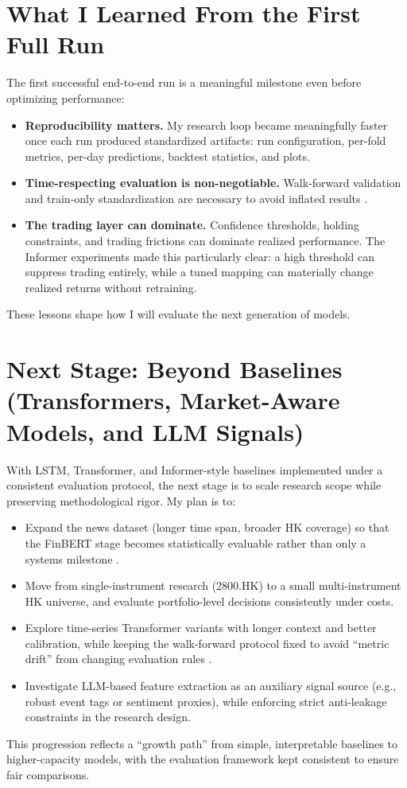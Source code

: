 \documentclass[letterpaper]{article} %
\begin{document}
\section{What I Learned From the First Full Run}
The first successful end-to-end run is a meaningful milestone even before optimizing performance:
\begin{itemize}
  \item \textbf{Reproducibility matters.} My research loop became meaningfully faster once each run produced standardized artifacts: run configuration, per-fold metrics, per-day predictions, backtest statistics, and plots.
  \item \textbf{Time-respecting evaluation is non-negotiable.} Walk-forward validation and train-only standardization are necessary to avoid inflated results \citep{bergmeir2018}.
  \item \textbf{The trading layer can dominate.} Confidence thresholds, holding constraints, and trading frictions can dominate realized performance. The Informer experiments made this particularly clear: a high threshold can suppress trading entirely, while a tuned mapping can materially change realized returns without retraining.
\end{itemize}
These lessons shape how I will evaluate the next generation of models.

\section{Next Stage: Beyond Baselines (Transformers, Market-Aware Models, and LLM Signals)}
With LSTM, Transformer, and Informer-style baselines implemented under a consistent evaluation protocol, the next stage is to scale research scope while preserving methodological rigor. My plan is to:
\begin{itemize}
  \item Expand the news dataset (longer time span, broader HK coverage) so that the FinBERT stage becomes statistically evaluable rather than only a systems milestone \citep{leetaru2013gdelt,araci2019finbert}.
  \item Move from single-instrument research (2800.HK) to a small multi-instrument HK universe, and evaluate portfolio-level decisions consistently under costs.
  \item Explore time-series Transformer variants with longer context and better calibration, while keeping the walk-forward protocol fixed to avoid ``metric drift'' from changing evaluation rules \citep{bailey2014,lopezdeprado2018}.
  \item Investigate LLM-based feature extraction as an auxiliary signal source (e.g., robust event tags or sentiment proxies), while enforcing strict anti-leakage constraints in the research design.
\end{itemize}
This progression reflects a ``growth path'' from simple, interpretable baselines to higher-capacity models, with the evaluation framework kept consistent to ensure fair comparisons.
\end{document}
